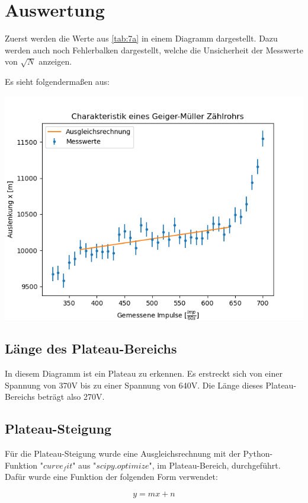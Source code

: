 \section{Auswertung}

Zuerst werden die Werte aus \ref{tab:7a} in einem Diagramm dargestellt.
Dazu werden auch noch Fehlerbalken dargestellt,
welche die Unsicherheit der Messwerte von $\sqrt{N}$ anzeigen.

\noindent Es sieht folgendermaßen aus:

\includegraphics{7a.png}

\subsection{Länge des Plateau-Bereichs}

\noindent In diesem Diagramm ist ein Plateau zu erkennen.
Es erstreckt sich von einer Spannung von 370V bis zu einer Spannung von 640V.
Die Länge dieses Plateau-Bereichs beträgt also 270V.

\subsection{Plateau-Steigung}

Für die Plateau-Steigung wurde eine Ausgleichsrechnung mit der Python-Funktion "$curve_fit$" aus "$scipy.optimize$", im Plateau-Bereich, durchgeführt.
Dafür wurde eine Funktion der folgenden Form verwendet:

\begin{displaymath}
    y = mx + n
\end{displaymath}

